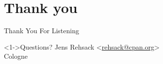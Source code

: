 \documentclass[ngerman,xcolor={table,dvipsnames},smaller,compress,hyperref={bookmarks,colorlinks}]{beamer}%
\begin{document}
%

\section{Thank you}

\begin{frame}[fragile]{Thank You For Listening}
\begin{block}<1->{Questions?}
Jens Rehsack \textless{}\href{mailto:rehsack@cpan.org}{rehsack@cpan.org}\textgreater{} \\
Cologne
\end{block}
\end{frame}
\end{document}
